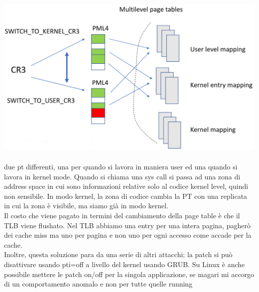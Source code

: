 \documentclass[14pt, oneside]{book}
\begin{document}
\includegraphics[scale=0.3]{immagini/KAISER}\\\\
due pt differenti, una per quando si lavora in maniera user ed una quando si lavora in kernel mode. Quando si chiama una sys call si passa ad una zona di address space in cui sono informazioni relative solo al codice kernel level, quindi non sensibile. In modo kernel, la zona di codice cambia la PT con una replicata in cui la zona è visibile, ma siamo già in modo kernel.\\ Il costo che viene pagato in termini del cambiamento della page table è che il TLB viene flushato. Nel TLB abbiamo una entry per una intera pagina, pagherò dei cache miss ma uno per pagina e non uno per ogni accesso come accade per la cache.\\ Inoltre, questa soluzione para da una serie di altri attacchi; la patch si può disattivare usando \textsf{pti=off} a livello del kernel usando GRUB. Su Linux è anche possibile mettere le patch on/off per la singola applicazione, se magari mi accorgo di un comportamento anomalo e non per tutte quelle running
\end{document}

